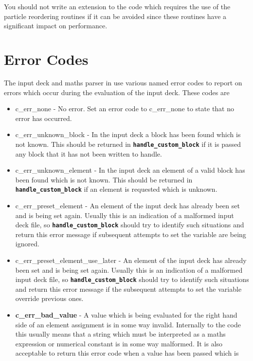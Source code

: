 \documentclass[12pt,a4paper]{article}
\newcommand{\inlinecode}[1]{{\color{warwickred} \bf\texttt{#1}}}
\newcommand{\EPOCH}{{\color{warwickdark}\fontfamily{phv}\selectfont{EPOCH}}}
\begin{document}
You should not write an extension to the code which requires the use of the
particle reordering routines if it can be avoided since these routines
have a significant impact on performance.

\pagebreak
\def\epoch{}
\pagebreak

\appendix
  \appendixpage
  \addappheadtotoc
\section{Error Codes}
The input deck and maths parser in {\EPOCH} use various named error codes to
report on errors which occur during the evaluation of the input deck. These
codes are
\begin{itemize}
\item c\_err\_none - No error. Set an error code to c\_err\_none to state that
  no error has occurred.
\item c\_err\_unknown\_block - In the input deck a block has been found which is
  not known. This should be returned in \inlinecode{handle\_custom\_block} if
  it is passed any block that it has not been written to handle.
\item c\_err\_unknown\_element - In the input deck an element of a valid block
  has been found which is not known. This should be returned in
  \inlinecode{handle\_custom\_block} if an element is requested which is
  unknown.
\item c\_err\_preset\_element - An element of the input deck has already been
  set and is being set again. Usually this is an indication of a malformed input
  deck file, so \inlinecode{handle\_custom\_block} should try to
  identify such situations and return this error message if
  subsequent attempts to set the variable are being ignored.
\item c\_err\_preset\_element\_use\_later - An element of the input deck has
  already been set and is being set again. Usually this is an indication of a
  malformed input deck file, so \inlinecode{handle\_custom\_block} should try to
  identify such situations and return this error message if
  the subsequent attempts to set the variable override previous ones.
\item {\bf c\_err\_bad\_value} - A value which is being evaluated for the right
  hand side of an element assignment is in some way invalid. Internally to the
  code this usually means that a string which must be interpreted as a maths
  expression or numerical constant is in some way malformed. It is also
  acceptable to return this error code when a value has been passed which is

\end{itemize}
\end{document}
